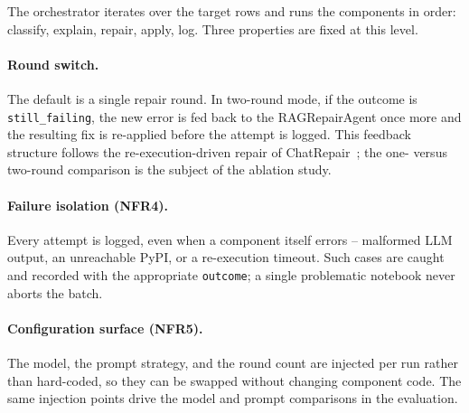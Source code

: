 The orchestrator iterates over the target rows and runs the components in
order: classify, explain, repair, apply, log. Three properties are fixed
at this level.


\paragraph{Round switch.}
The default is a single repair round. In two-round mode, if the outcome is
\texttt{still\_failing}, the new error is fed back to the RAGRepairAgent
once more and the resulting fix is re-applied before the attempt is
logged. This feedback structure follows the re-execution-driven repair of
ChatRepair~\cite{xia2024chatrepair};
the one- versus two-round comparison is the subject of the ablation study.

\paragraph{Failure isolation (NFR4).}
Every attempt is logged, even when a component itself errors -- malformed
LLM output, an unreachable PyPI, or a re-execution timeout. Such cases are
caught and recorded with the appropriate \texttt{outcome}; a single
problematic notebook never aborts the batch.

\paragraph{Configuration surface (NFR5).}
The model, the prompt strategy, and the round count are injected per run
rather than hard-coded, so they can be swapped without changing component
code. The same injection points drive the model and prompt comparisons in
the evaluation.

